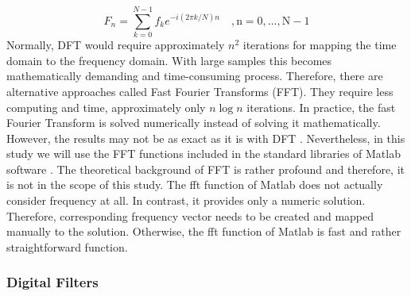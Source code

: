 \documentclass[english,12pt,a4paper,pdftex,elec,utf8]{aaltothesis}
\begin{document}
\begin{equation} \label{fftequation}
F_n =  \sum \limits^{N-1}_{k=0} f_k e^{-i(2\pi k / N) n} \mathrm{\hspace{1em} , n = 0, \dots , N -1} 
\end{equation} 
Normally, DFT would require approximately $n^2$ iterations for mapping the time domain to the frequency domain. With large samples this becomes mathematically demanding and time-consuming process. Therefore, there are alternative approaches called Fast Fourier Transforms (FFT). They require less computing and time, approximately only $n \log n$ iterations. In practice, the fast Fourier Transform is solved numerically instead of solving it mathematically. However, the results may not be as exact as it is with DFT \cite{khan2005digital} \cite{rao2012fast}. Nevertheless, in this study we will use the FFT functions included in the standard libraries of Matlab software \cite{matlabfft}. The theoretical background of FFT is rather profound and therefore, it is not in the scope of this study. The fft function of Matlab does not actually consider frequency at all. In contrast, it provides only a numeric solution. Therefore, corresponding frequency vector needs to be created and mapped manually to the solution. Otherwise, the fft function of Matlab is fast and rather straightforward function.





\subsubsection{Digital Filters} \label{digitalfilterssection}
\end{document}
